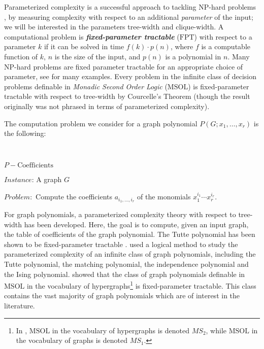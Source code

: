 \documentclass{llncs}
\newcommand{\MSOL}{\mathrm{MSOL}}
\newcommand{\FPT}{\mathrm{FPT}}
\newcommand{\NP}{\mathrm{NP}}
\begin{document}
Parameterized complexity is a successful approach to tackling $\NP$-hard
problems \cite{bk:DF99,bk:FG06}, by measuring complexity with respect
to an additional {\em parameter} of the input; we will be interested in the parameters
tree-width and clique-width. A computational problem is {\em\bf fixed-parameter tractable}
($\FPT$) with respect to a parameter $k$ if it can be solved in
time $f(k)\cdot p(n)$, where $f$ is a computable function of $k$,
$n$ is the size of the input, and $p(n)$ is a polynomial in $n$.
Many $\NP$-hard problems are fixed parameter tractable for an appropriate
choice of parameter, see \cite{bk:FG06} for many examples. Every
problem in the infinite class of decision problems definable in {\em Monadic Second Order Logic}
($\MSOL$) is fixed-parameter tractable with respect to tree-width
by Courcelle's Theorem \cite{ar:Courcelle90,ar:ArnborgEtAl,bk:CourcelleEngelfriet12}
(though the result originally was not phrased in terms of parameterized
complexity). 

The computation problem we consider for a graph polynomial $P(G;x_{1},\ldots,x_{r})$
is the following:

~~~~~~~~~~\begin{minipage}[t]{1\columnwidth}$P-\mathrm{Coefficients}$

$\mathit{Instance}$: A graph $G$

$\mathit{Problem}:$ Compute the coefficients $a_{i_{1},\ldots,i_{r}}$
of the monomials $x_{1}^{i_{1}}\cdots x_{r}^{i_{r}}$. \end{minipage}

For graph polynomials, a parameterized complexity theory with respect
to tree-width has been developed. Here, the goal is to compute, given
an input graph, the table of coefficients of the graph polynomial.
The Tutte polynomial has been shown to be fixed-parameter tractable
\cite{ar:noble98,ar:andrzejak98}. \cite{makowsky2005coloured} used
a logical method to study the parameterized complexity of an infinite
class of graph polynomials, including the Tutte polynomial, the matching
polynomial, the independence polynomial and the Ising polynomial.
\cite{makowsky2005coloured} showed that the class of graph polynomials
definable in $\MSOL$ in the vocabulary of hypergraphs\footnote{In \cite{bk:CourcelleEngelfriet12}, $\MSOL$ in the vocabulary of hypergraphs is denoted $MS_2$, while $\MSOL$ in the vocabulary of graphs is denoted $MS_1$.}
is fixed-parameter tractable. This class contains the vast majority
of graph polynomials which are of interest in the literature. 
\end{document}
